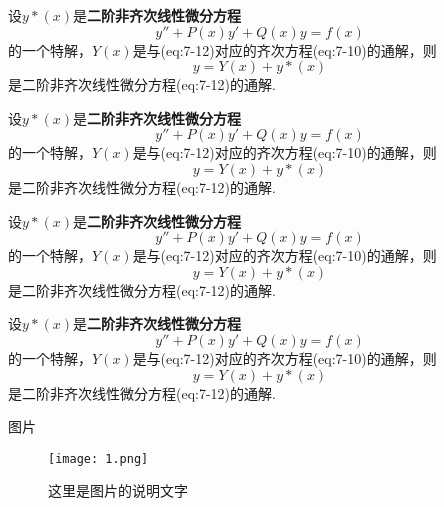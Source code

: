 \documentclass[12pt, a4paper, oneside, UTF8]{ctexbook}  %
\begin{document}
\begin{lemma}[线性微分方程解的结构]
    设$y*(x)$是\textbf{二阶非齐次线性微分方程}
    \begin{equation}
        y'' + P(x)y'+Q(x)y = f(x)
    \end{equation}
    的一个特解，$Y(x)$是与(eq:7-12)对应的齐次方程(eq:7-10)的通解，则
    \begin{equation}
        y = Y(x)+y*(x)
    \end{equation}
    是二阶非齐次线性微分方程(eq:7-12)的通解.
\end{lemma}

\begin{corollary}[线性微分方程解的结构]
    设$y*(x)$是\textbf{二阶非齐次线性微分方程}
    \begin{equation}
        y'' + P(x)y'+Q(x)y = f(x)
    \end{equation}
    的一个特解，$Y(x)$是与(eq:7-12)对应的齐次方程(eq:7-10)的通解，则
    \begin{equation}
        y = Y(x)+y*(x)
    \end{equation}
    是二阶非齐次线性微分方程(eq:7-12)的通解.
\end{corollary}

\begin{criterion}[线性微分方程解的结构]
    设$y*(x)$是\textbf{二阶非齐次线性微分方程}
    \begin{equation}
        y'' + P(x)y'+Q(x)y = f(x)
    \end{equation}
    的一个特解，$Y(x)$是与(eq:7-12)对应的齐次方程(eq:7-10)的通解，则
    \begin{equation}
        y = Y(x)+y*(x)
    \end{equation}
    是二阶非齐次线性微分方程(eq:7-12)的通解.
\end{criterion}

\begin{rmk}[线性微分方程解的结构]
    设$y*(x)$是\textbf{二阶非齐次线性微分方程}
    \begin{equation}
        y'' + P(x)y'+Q(x)y = f(x)
    \end{equation}
    的一个特解，$Y(x)$是与(eq:7-12)对应的齐次方程(eq:7-10)的通解，则
    \begin{equation}
        y = Y(x)+y*(x)
    \end{equation}
    是二阶非齐次线性微分方程(eq:7-12)的通解.
\end{rmk}

图片

\begin{figure}[htbp]
    \centering
    \texttt{[image: 1.png]}
    \caption{这里是图片的说明文字}
\end{figure}

\ifx\allfiles\undefined
\end{document}
